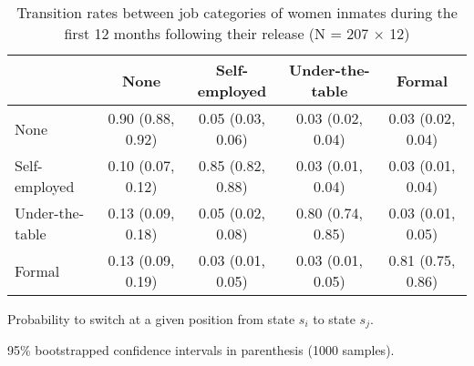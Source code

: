\begin{table}[htp]
\scriptsize
\setlength{\tabcolsep}{10pt}
\renewcommand{\arraystretch}{1.3}
\begin{threeparttable}
\centering
\caption{Transition rates between job categories of women inmates \newline
    during the first 12 months following their release (N = 207 $\times$ 12)} 
\label{tab:transition_rates_job}
\begin{tabular}{lcccc}
  \hline
 & None & Self-employed & Under-the-table & Formal \\ 
  \hline
None & 0.90 (0.88, 0.92) & 0.05 (0.03, 0.06) & 0.03 (0.02, 0.04) & 0.03 (0.02, 0.04) \\ 
  Self-employed & 0.10 (0.07, 0.12) & 0.85 (0.82, 0.88) & 0.03 (0.01, 0.04) & 0.03 (0.01, 0.04) \\ 
  Under-the-table & 0.13 (0.09, 0.18) & 0.05 (0.02, 0.08) & 0.80 (0.74, 0.85) & 0.03 (0.01, 0.05) \\ 
  Formal & 0.13 (0.09, 0.19) & 0.03 (0.01, 0.05) & 0.03 (0.01, 0.05) & 0.81 (0.75, 0.86) \\ 
   \hline
\end{tabular}
\begin{tablenotes}
\scriptsize
\item Probability to switch at a given position from state $s_i$ to state $s_j$. 
    \item 95\% bootstrapped confidence intervals in parenthesis (1000 samples).
\end{tablenotes}
\end{threeparttable}
\end{table}
